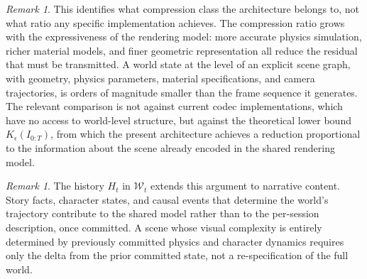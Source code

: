 \documentclass[11pt,a4paper]{article}
\theoremstyle{plain}
\theoremstyle{definition}
\theoremstyle{remark}
\newtheorem{remark}[theorem]{Remark}
\begin{document}
\begin{remark}
This identifies what compression class the architecture belongs to, not what ratio any specific implementation achieves. The compression ratio grows with the expressiveness of the rendering model: more accurate physics simulation, richer material models, and finer geometric representation all reduce the residual that must be transmitted. A world state at the level of an explicit scene graph, with geometry, physics parameters, material specifications, and camera trajectories, is orders of magnitude smaller than the frame sequence it generates. The relevant comparison is not against current codec implementations, which have no access to world-level structure, but against the theoretical lower bound $K_\epsilon(I_{0:T})$, from which the present architecture achieves a reduction proportional to the information about the scene already encoded in the shared rendering model.
\end{remark}

\begin{remark}
The history $H_t$ in $\mathcal{W}_t$ extends this argument to narrative content. Story facts, character states, and causal events that determine the world's trajectory contribute to the shared model rather than to the per-session description, once committed. A scene whose visual complexity is entirely determined by previously committed physics and character dynamics requires only the delta from the prior committed state, not a re-specification of the full world.
\end{remark}
\end{document}
